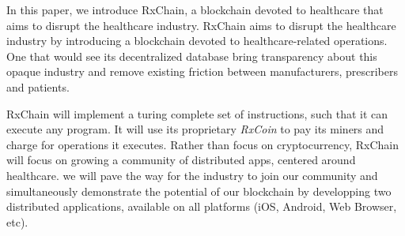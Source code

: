 In this paper, we introduce RxChain, a blockchain devoted to healthcare that aims to disrupt the healthcare industry.
RxChain aims to disrupt the healthcare industry by introducing a blockchain devoted to healthcare-related operations.
One that would see its decentralized database bring transparency about this opaque industry
and remove existing friction between manufacturers, prescribers and patients.

RxChain will implement a turing complete set of instructions, such that it can execute any program.
It will use its proprietary \emph{RxCoin} to pay its miners and charge for operations it executes.
Rather than focus on cryptocurrency, RxChain will focus on growing a community of distributed apps,
centered around healthcare.
we will pave the way for the industry to join our community and simultaneously demonstrate the potential of our blockchain
by developping two distributed applications, available on all platforms (iOS, Android, Web  Browser, etc).





